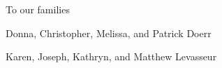 \documentclass[oneside,10pt,]{book}
\numberwithin{equation}{section}
\begin{document}
\thispagestyle{empty}
\begin{center}\Large%
To our families%
\end{center}
\begin{center}\Large%
Donna, Christopher, Melissa, and Patrick Doerr%
\end{center}
\begin{center}\Large%
Karen, Joseph, Kathryn, and Matthew Levasseur%
\end{center}
\clearpage
\thispagestyle{empty}
\null%
\clearpage
%
%
\typeout{************************************************}
\typeout{************************************************}
%
\end{document}
